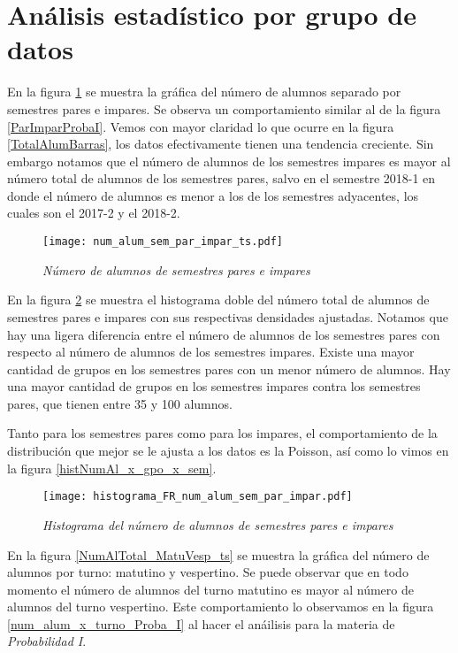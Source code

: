 \section{Análisis estadístico por grupo de datos}

En la figura \ref{NumAlTotal_ParImpar_ts} se muestra la gráfica del número de alumnos separado por semestres pares e impares. Se observa un comportamiento similar al de la figura \ref{ParImparProbaI}. Vemos con mayor claridad lo que ocurre en la figura \ref{TotalAlumBarras}, los datos efectivamente tienen una tendencia creciente. Sin embargo notamos que el número de alumnos de los semestres impares es mayor al número total de alumnos de los semestres pares, salvo en el semestre 2018-1 en donde el número de alumnos es menor a los de los semestres adyacentes, los cuales son el 2017-2 y el 2018-2.

\begin{figure}[H]
\centering
\texttt{[image: num\_alum\_sem\_par\_impar\_ts.pdf]} %
\caption{\textit{Número de alumnos de semestres pares e impares}}\label{NumAlTotal_ParImpar_ts}
\end{figure}


En la figura \ref{histNumAlTotal_ParImpar} se muestra el histograma doble del número total de alumnos de semestres pares e impares con sus respectivas densidades ajustadas. Notamos que hay una ligera diferencia entre el número de alumnos de los semestres pares con respecto al número de alumnos de los semestres impares. Existe una mayor cantidad de grupos en los semestres pares con un menor número de alumnos. Hay una mayor cantidad de grupos en los semestres impares contra los semestres pares, que tienen entre 35 y 100 alumnos.

Tanto para los semestres pares como para los impares, el comportamiento de la distribución que mejor se le ajusta a los datos es la Poisson, así como lo vimos en la figura \ref{histNumAl_x_gpo_x_sem}.

\begin{figure}[H]
\centering
\texttt{[image: histograma\_FR\_num\_alum\_sem\_par\_impar.pdf]} %
\caption{\textit{Histograma del número de alumnos de semestres pares e impares}}\label{histNumAlTotal_ParImpar}
\end{figure}


En la figura \ref{NumAlTotal_MatuVesp_ts} se muestra la gráfica del número de alumnos por turno: matutino y vespertino. Se puede observar que en todo momento el número de alumnos del turno matutino es mayor al número de alumnos del turno vespertino. Este comportamiento lo observamos en la figura \ref{num_alum_x_turno_Proba_I} al hacer el anáilisis para la materia de \textit{Probabilidad I}.

